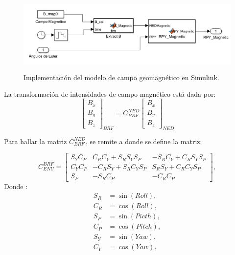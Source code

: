 
\begin{figure}[!ht]
	\begin{center}
		\includegraphics[scale=0.4]{imagenes/modelo_dinamico/modelo_campoMagnetico.PNG}\\
	\end{center}
	\caption{Implementación del modelo de campo geomagnético en Simulink.}
	\label{fig:modeloB}
	\textit{}
\end{figure}

La transformación de intensidades de campo magnético está dada por: 
\begin{equation}	
	\left[\begin{array}{c}
		B_x\\
		B_y\\
		B_z
	\end{array}\right]_{BRF} = 
	C_{BRF}^{NED}
	\left[\begin{array}{c}
		B_x\\
		B_y\\
		B_z
	\end{array}\right]_{NED}	
\end{equation}

Para hallar la matriz $C_{BRF}^{NED}$, se remite a \cite{grewal2007global} donde se define la matriz:

$$
C_{ENU}^{BRF}=\left[\begin{array}{ccc}
	S_Y C_P & C_R C_Y+S_R S_Y S_P & -S_R C_Y+C_R S_Y S_P \\
	C_Y C_P & -C_R S_Y+S_R C_Y S_P & S_R S_Y+C_R C_Y S_P \\
	S_P & -S_R C_P & -C_R C_P
\end{array}\right],
$$
Donde :
$$
\begin{aligned}
	S_R & =\sin (Roll), \\
	C_R & =\cos (Roll), \\
	S_P & =\sin (Picth), \\
	C_P & =\cos (Pitch), \\
	S_Y & =\sin (Yaw), \\
	C_Y & =\cos (Yaw),
\end{aligned}
$$

